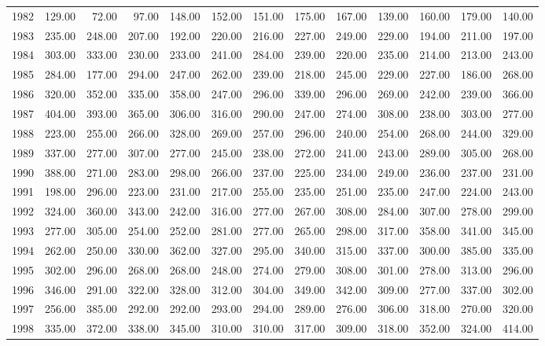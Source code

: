 \begin{longtable}{rrrrrrrrrrrrr}
  1982 & 129.00 & 72.00 & 97.00 & 148.00 & 152.00 & 151.00 & 175.00 & 167.00 & 139.00 & 160.00 & 179.00 & 140.00 \\ 
  1983 & 235.00 & 248.00 & 207.00 & 192.00 & 220.00 & 216.00 & 227.00 & 249.00 & 229.00 & 194.00 & 211.00 & 197.00 \\ 
  1984 & 303.00 & 333.00 & 230.00 & 233.00 & 241.00 & 284.00 & 239.00 & 220.00 & 235.00 & 214.00 & 213.00 & 243.00 \\ 
  1985 & 284.00 & 177.00 & 294.00 & 247.00 & 262.00 & 239.00 & 218.00 & 245.00 & 229.00 & 227.00 & 186.00 & 268.00 \\ 
  1986 & 320.00 & 352.00 & 335.00 & 358.00 & 247.00 & 296.00 & 339.00 & 296.00 & 269.00 & 242.00 & 239.00 & 366.00 \\ 
  1987 & 404.00 & 393.00 & 365.00 & 306.00 & 316.00 & 290.00 & 247.00 & 274.00 & 308.00 & 238.00 & 303.00 & 277.00 \\ 
  1988 & 223.00 & 255.00 & 266.00 & 328.00 & 269.00 & 257.00 & 296.00 & 240.00 & 254.00 & 268.00 & 244.00 & 329.00 \\ 
  1989 & 337.00 & 277.00 & 307.00 & 277.00 & 245.00 & 238.00 & 272.00 & 241.00 & 243.00 & 289.00 & 305.00 & 268.00 \\ 
  1990 & 388.00 & 271.00 & 283.00 & 298.00 & 266.00 & 237.00 & 225.00 & 234.00 & 249.00 & 236.00 & 237.00 & 231.00 \\ 
  1991 & 198.00 & 296.00 & 223.00 & 231.00 & 217.00 & 255.00 & 235.00 & 251.00 & 235.00 & 247.00 & 224.00 & 243.00 \\ 
  1992 & 324.00 & 360.00 & 343.00 & 242.00 & 316.00 & 277.00 & 267.00 & 308.00 & 284.00 & 307.00 & 278.00 & 299.00 \\ 
  1993 & 277.00 & 305.00 & 254.00 & 252.00 & 281.00 & 277.00 & 265.00 & 298.00 & 317.00 & 358.00 & 341.00 & 345.00 \\ 
  1994 & 262.00 & 250.00 & 330.00 & 362.00 & 327.00 & 295.00 & 340.00 & 315.00 & 337.00 & 300.00 & 385.00 & 335.00 \\ 
  1995 & 302.00 & 296.00 & 268.00 & 268.00 & 248.00 & 274.00 & 279.00 & 308.00 & 301.00 & 278.00 & 313.00 & 296.00 \\ 
  1996 & 346.00 & 291.00 & 322.00 & 328.00 & 312.00 & 304.00 & 349.00 & 342.00 & 309.00 & 277.00 & 337.00 & 302.00 \\ 
  1997 & 256.00 & 385.00 & 292.00 & 292.00 & 293.00 & 294.00 & 289.00 & 276.00 & 306.00 & 318.00 & 270.00 & 320.00 \\ 
  1998 & 335.00 & 372.00 & 338.00 & 345.00 & 310.00 & 310.00 & 317.00 & 309.00 & 318.00 & 352.00 & 324.00 & 414.00 \\ 

\end{longtable}
